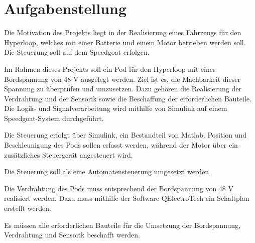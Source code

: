 

\section{Aufgabenstellung}
Die Motivation des Projekts liegt in der Realisierung eines Fahrzeugs für den Hyperloop, welches mit einer Batterie und einem Motor betrieben werden soll. Die Steuerung soll auf dem Speedgoat erfolgen.
\newline

Im Rahmen dieses Projekts soll ein Pod für den Hyperloop mit einer Bordspannung von 48 V ausgelegt werden. Ziel ist es, die Machbarkeit dieser Spannung zu überprüfen und umzusetzen. Dazu gehören die Realisierung der Verdrahtung und der Sensorik sowie die Beschaffung der erforderlichen Bauteile. Die Logik- und Signalverarbeitung wird mithilfe von Simulink auf einem Speedgoat-System durchgeführt.


Die Steuerung erfolgt über Simulink, ein Bestandteil von Matlab. Position und Beschleunigung des Pods sollen erfasst werden, während der Motor über ein zusätzliches Steuergerät angesteuert wird.

Die Steuerung soll als eine Automatensteuerung umgesetzt werden.

Die Verdrahtung des Pods muss entsprechend der Bordspannung von 48 V realisiert werden. Dazu muss mithilfe der Software QElectroTech ein Schaltplan erstellt werden.

Es müssen alle erforderlichen Bauteile für die Umsetzung der Bordspannung, Verdrahtung und Sensorik beschafft werden.



\pagebreak


